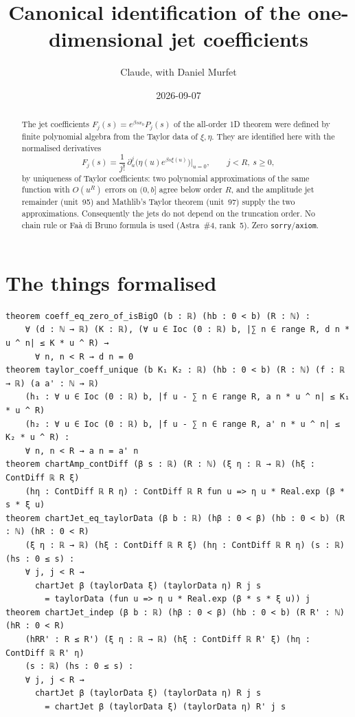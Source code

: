 \documentclass[11pt]{article}
\title{Canonical identification of the one-dimensional jet coefficients}
\author{Claude, with Daniel Murfet}
\date{2026-09-07}
\begin{document}
\maketitle
\sloppy

\begin{abstract}
The jet coefficients $F_j(s)=e^{\beta sx_0}P_j(s)$ of the all-order 1D theorem were defined by finite
polynomial algebra from the Taylor data of $\xi,\eta$. They are identified here with the normalised
derivatives
\[
F_j(s)=\frac1{j!}\,\partial_u^j\bigl(\eta(u)e^{\beta s\xi(u)}\bigr)\Big|_{u=0},\qquad j<R,\ s\ge0,
\]
by uniqueness of Taylor coefficients: two polynomial approximations of the same function with
$O(u^R)$ errors on $(0,b]$ agree below order $R$, and the amplitude jet remainder (unit~95) and
Mathlib's Taylor theorem (unit~97) supply the two approximations. Consequently the jets do not
depend on the truncation order. No chain rule or Fa\`a di Bruno formula is used (Astra~\#4,
rank~5). Zero \texttt{sorry}/\texttt{axiom}.
\end{abstract}

\section{The things formalised}
{\small
\begin{verbatim}
theorem coeff_eq_zero_of_isBigO (b : ℝ) (hb : 0 < b) (R : ℕ) :
    ∀ (d : ℕ → ℝ) (K : ℝ), (∀ u ∈ Ioc (0 : ℝ) b, |∑ n ∈ range R, d n * u ^ n| ≤ K * u ^ R) →
      ∀ n, n < R → d n = 0
theorem taylor_coeff_unique (b K₁ K₂ : ℝ) (hb : 0 < b) (R : ℕ) (f : ℝ → ℝ) (a a' : ℕ → ℝ)
    (h₁ : ∀ u ∈ Ioc (0 : ℝ) b, |f u - ∑ n ∈ range R, a n * u ^ n| ≤ K₁ * u ^ R)
    (h₂ : ∀ u ∈ Ioc (0 : ℝ) b, |f u - ∑ n ∈ range R, a' n * u ^ n| ≤ K₂ * u ^ R) :
    ∀ n, n < R → a n = a' n
theorem chartAmp_contDiff (β s : ℝ) (R : ℕ) (ξ η : ℝ → ℝ) (hξ : ContDiff ℝ R ξ)
    (hη : ContDiff ℝ R η) : ContDiff ℝ R fun u => η u * Real.exp (β * s * ξ u)
theorem chartJet_eq_taylorData (β b : ℝ) (hβ : 0 < β) (hb : 0 < b) (R : ℕ) (hR : 0 < R)
    (ξ η : ℝ → ℝ) (hξ : ContDiff ℝ R ξ) (hη : ContDiff ℝ R η) (s : ℝ) (hs : 0 ≤ s) :
    ∀ j, j < R →
      chartJet β (taylorData ξ) (taylorData η) R j s
        = taylorData (fun u => η u * Real.exp (β * s * ξ u)) j
theorem chartJet_indep (β b : ℝ) (hβ : 0 < β) (hb : 0 < b) (R R' : ℕ) (hR : 0 < R)
    (hRR' : R ≤ R') (ξ η : ℝ → ℝ) (hξ : ContDiff ℝ R' ξ) (hη : ContDiff ℝ R' η)
    (s : ℝ) (hs : 0 ≤ s) :
    ∀ j, j < R →
      chartJet β (taylorData ξ) (taylorData η) R j s
        = chartJet β (taylorData ξ) (taylorData η) R' j s
\end{verbatim}
}
\end{document}
